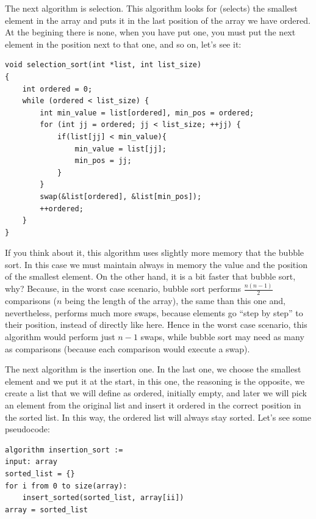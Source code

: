 \documentclass[a4paper]{article}
\begin{document}
The next algorithm is selection. This algorithm looks for (selects) the smallest
element in the array and puts it in the last position of the array we have
ordered. At the begining there is none, when you have put one, you must put the
next element in the position next to that one, and so on, let's see it:

\noindent
\begin{minipage}[H]{\linewidth}
\mbox{}
\begin{lstlisting}[style=C,
caption={Algoritmo de selección},
label={lst:selectionSort}]
void selection_sort(int *list, int list_size)
{
    int ordered = 0;
    while (ordered < list_size) {
        int min_value = list[ordered], min_pos = ordered;
        for (int jj = ordered; jj < list_size; ++jj) {
            if(list[jj] < min_value){
                min_value = list[jj];
                min_pos = jj;
            }
        }
        swap(&list[ordered], &list[min_pos]);
        ++ordered;
    }
}
\end{lstlisting}
\end{minipage}

If you think about it, this algorithm uses slightly more memory that the bubble
sort. In this case we must maintain always in memory the value and the position
of the smallest element. On the other hand, it is a bit faster that bubble sort,
why? Because, in the worst case scenario, bubble sort performs
$\frac{n(n-1)}{2}$ comparisons ($n$ being the length of the array),
the same than this one and, nevertheless,
performs much more swaps, because elements go ``step by step'' to their
position, instead of directly like here. Hence in the worst case scenario, this
algorithm would perform just $n-1$ swaps, while bubble sort may need as many
as comparisons (because each comparison would execute a swap).

The next algorithm is the insertion one. In the last one, we choose the smallest
element and we put it at the start, in this one, the reasoning is the opposite,
we create a list that we will define as ordered, initially empty, and later we
will pick an element from the original list and insert it ordered in the correct
position in the sorted list. In this way, the ordered list will always stay
sorted. Let's see some pseudocode:

\noindent
\begin{minipage}[H]{\linewidth}
\mbox{}
\begin{lstlisting}[style=pseudoCode]
algorithm insertion_sort :=
input: array
sorted_list = {}
for i from 0 to size(array):
    insert_sorted(sorted_list, array[ii])
array = sorted_list
\end{lstlisting}
\end{minipage}
\end{document}

